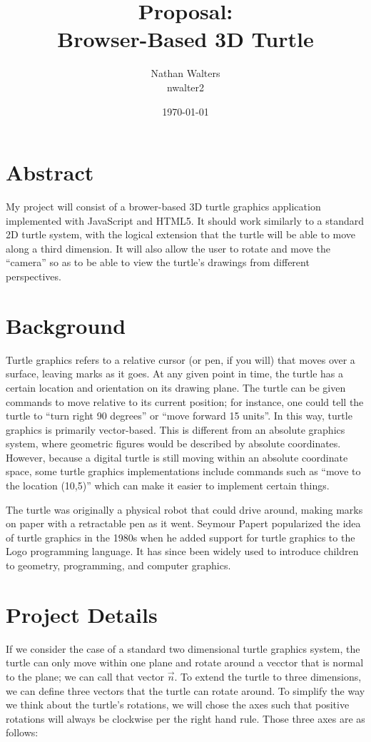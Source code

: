 \documentclass[12pt]{article}
\title{\vspace{-8ex}Proposal:\\Browser-Based 3D Turtle}
\author{Nathan Walters\\nwalter2}
\date{\today}
\begin{document}
\maketitle

\section{Abstract}

My project will consist of a brower-based 3D turtle graphics application implemented with JavaScript and HTML5. It should work similarly to a standard 2D turtle system, with the logical extension that the turtle will be able to move along a third dimension. It will also allow the user to rotate and move the ``camera'' so as to be able to view the turtle's drawings from different perspectives.

\section{Background}

Turtle graphics refers to a relative cursor (or pen, if you will) that moves over a surface, leaving marks as it goes. At any given point in time, the turtle has a certain location and orientation on its drawing plane. The turtle can be given commands to move relative to its current position; for instance, one could tell the turtle to ``turn right 90 degrees'' or ``move forward 15 units''. In this way, turtle graphics is primarily vector-based. This is different from an absolute graphics system, where geometric figures would be described by absolute coordinates. However, because a digital turtle is still moving within an absolute coordinate space, some turtle graphics implementations include commands such as ``move to the location (10,5)'' which can make it easier to implement certain things.

The turtle was originally a physical robot that could drive around, making marks on paper with a retractable pen as it went. Seymour Papert popularized the idea of turtle graphics in the 1980s when he added support for turtle graphics to the Logo programming language. It has since been widely used to introduce children to geometry, programming, and computer graphics.

\section{Project Details}

If we consider the case of a standard two dimensional turtle graphics system, the turtle can only move within one plane and rotate around a vecctor that is normal to the plane; we can call that vector $\vec{n}$. To extend the turtle to three dimensions, we can define three vectors that the turtle can rotate around. To simplify the way we think about the turtle's rotations, we will chose the axes such that positive rotations will always be clockwise per the right hand rule. Those three axes are as follows:
\end{document}
